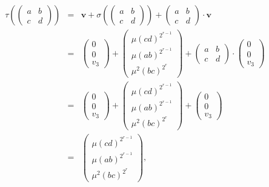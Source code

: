 \begin{eqnarray*}
\tau\left(\left(\begin{matrix} a & b \\ c & d \end{matrix}\right)\right) &=&
\mathbf{v} + \sigma\left(\left(\begin{matrix} a & b \\ c & d \end{matrix}\right)\right) + 
\left(\begin{matrix} a & b \\ c & d \end{matrix}\right) \cdot \mathbf{v} \\
 &=&
\left(\begin{matrix} 0 \\ 0 \\ v_3 \end{matrix}\right) + 
\left(\begin{matrix}  \mu(cd)^{2^{r-1}}  \\ \mu\left(ab \right)^{2^{r-1}} \\ \mu^2\left( bc \right)^{2^r} \end{matrix}\right)+ 
\left(\begin{matrix} a & b \\ c & d \end{matrix}\right) \cdot 
\left(\begin{matrix} 0 \\ 0 \\ v_3 \end{matrix}\right) \\
 &=&
\left(\begin{matrix} 0 \\ 0 \\ v_3 \end{matrix}\right) + 
\left(\begin{matrix}  \mu(cd)^{2^{r-1}}  \\ \mu\left(ab \right)^{2^{r-1}} \\ \mu^2\left( bc \right)^{2^r} \end{matrix}\right)+ 
\left(\begin{matrix} 0 \\ 0 \\ v_3 \end{matrix}\right) \\
&=& \left(\begin{matrix}  \mu(cd)^{2^{r-1}}  \\ \mu\left(ab \right)^{2^{r-1}} \\ \mu^2\left( bc \right)^{2^r} \end{matrix}\right),
\end{eqnarray*}
